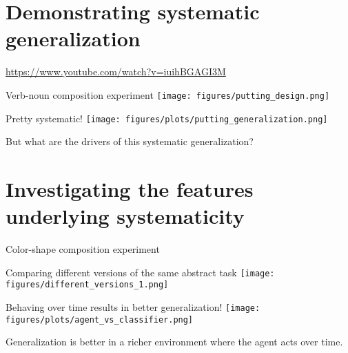 \documentclass{beamer}
\begin{document}
\section{Demonstrating systematic generalization}

\begin{frame}[standout]
\url{https://www.youtube.com/watch?v=iuihBGAGI3M}
\end{frame}

\begin{frame}{Verb-noun composition experiment}
\centering
\texttt{[image: figures/putting\_design.png]}
\end{frame}

\begin{frame}{Pretty systematic!}
\centering
\texttt{[image: figures/plots/putting\_generalization.png]}
\end{frame}

\begin{frame}[standout]
But what are the drivers of this systematic generalization?
\end{frame}

\section{Investigating the features underlying systematicity}

\begin{frame}{Color-shape composition experiment}
\centering
{}
\end{frame}

\begin{frame}{Comparing different versions of the same abstract task}
\centering
\texttt{[image: figures/different\_versions\_1.png]}
\end{frame}

\begin{frame}{Behaving over time results in better generalization!}
\vspace{1em}
\centering
\texttt{[image: figures/plots/agent\_vs\_classifier.png]}
\end{frame}

\begin{frame}[standout]
Generalization is better in a richer environment where the agent acts over time.
\end{frame}
\end{document}

